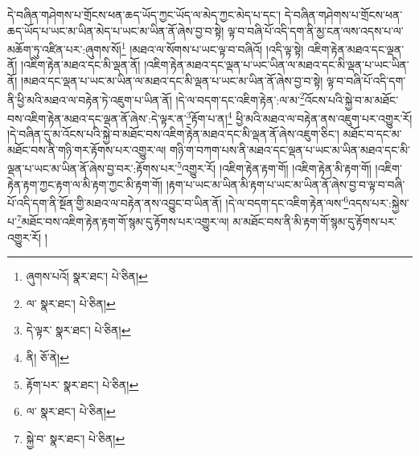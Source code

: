 དེ་བཞིན་གཤེགས་པ་གྲོངས་ཕན་ཆད་ཡོད་ཀྱང་ཡོད་ལ་མེད་ཀྱང་མེད་པ་དང་། དེ་བཞིན་གཤེགས་པ་གྲོངས་ཕན་ཆད་ཡོད་པ་ཡང་མ་ཡིན་མེད་པ་ཡང་མ་ཡིན་ནོ་ཞེས་བྱ་བ་སྟེ། ལྟ་བ་བཞི་པོ་འདི་དག་ནི་མྱ་ངན་ལས་འདས་པ་ལ་མཆོག་ཏུ་འཛིན་པར་:ཞུགས་སོ།\footnote{ཞུགས་པའོ།  སྣར་ཐང་།  པེ་ཅིན། } །མཐའ་ལ་སོགས་པ་ཡང་ལྟ་བ་བཞིའོ། །འདི་ལྟ་སྟེ། འཇིག་རྟེན་མཐའ་དང་ལྡན་ནོ། །འཇིག་རྟེན་མཐའ་དང་མི་ལྡན་ནོ། །འཇིག་རྟེན་མཐའ་དང་ལྡན་པ་ཡང་ཡིན་ལ་མཐའ་དང་མི་ལྡན་པ་ཡང་ཡིན་ནོ། །མཐའ་དང་ལྡན་པ་ཡང་མ་ཡིན་ལ་མཐའ་དང་མི་ལྡན་པ་ཡང་མ་ཡིན་ནོ་ཞེས་བྱ་བ་སྟེ། ལྟ་བ་བཞི་པོ་འདི་དག་ནི་ཕྱི་མའི་མཐའ་ལ་བརྟེན་ཏེ་འཇུག་པ་ཡིན་ནོ། །དེ་ལ་བདག་དང་འཇིག་རྟེན་:ལ་མ་\footnote{ལ་  སྣར་ཐང་།  པེ་ཅིན། }འོངས་པའི་སྐྱེ་བ་མ་མཐོང་བས་འཇིག་རྟེན་མཐའ་དང་ལྡན་ནོ་ཞེས་:དེ་ལྟར་ན་\footnote{དེ་ལྟར་  སྣར་ཐང་།  པེ་ཅིན། }རྟོག་པ་ན།\footnote{ནི།  ཅོ་ནེ། } ཕྱི་མའི་མཐའ་ལ་བརྟེན་ནས་འཇུག་པར་འགྱུར་རོ། །དེ་བཞིན་དུ་མ་འོངས་པའི་སྐྱེ་བ་མཐོང་བས་འཇིག་རྟེན་མཐའ་དང་མི་ལྡན་ནོ་ཞེས་འཇུག་ཅིང་། མཐོང་བ་དང་མ་མཐོང་བས་ནི་གཉི་གར་རྟོགས་པར་འགྱུར་ལ། གཉི་ག་བཀག་པས་ནི་མཐའ་དང་ལྡན་པ་ཡང་མ་ཡིན་མཐའ་དང་མི་ལྡན་པ་ཡང་མ་ཡིན་ནོ་ཞེས་བྱ་བར་:རྟོགས་པར་\footnote{རྟོག་པར་  སྣར་ཐང་།  པེ་ཅིན། }འགྱུར་རོ། །འཇིག་རྟེན་རྟག་གོ། །འཇིག་རྟེན་མི་རྟག་གོ། །འཇིག་རྟེན་རྟག་ཀྱང་རྟག་ལ་མི་རྟག་ཀྱང་མི་རྟག་གོ། །རྟག་པ་ཡང་མ་ཡིན་མི་རྟག་པ་ཡང་མ་ཡིན་ནོ་ཞེས་བྱ་བ་ལྟ་བ་བཞི་པོ་འདི་དག་ནི་སྔོན་གྱི་མཐའ་ལ་བརྟེན་ནས་འབྱུང་བ་ཡིན་ནོ། །དེ་ལ་བདག་དང་འཇིག་རྟེན་ལས་\footnote{ལ་  སྣར་ཐང་།  པེ་ཅིན། }འདས་པར་:སྐྱེས་པ་\footnote{སྐྱེ་བ་  སྣར་ཐང་།  པེ་ཅིན། }མཐོང་བས་འཇིག་རྟེན་རྟག་གོ་སྙམ་དུ་རྟོགས་པར་འགྱུར་ལ། མ་མཐོང་བས་ནི་མི་རྟག་གོ་སྙམ་དུ་རྟོགས་པར་འགྱུར་རོ། །
